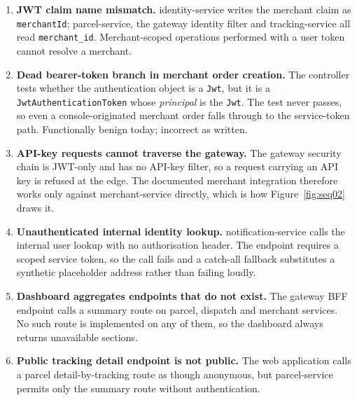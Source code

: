 \documentclass[11pt,a4paper,oneside,openany]{report}
\newcommand{\code}[1]{\texttt{\small #1}}
\begin{document}
\begin{enumerate}[leftmargin=*]
\item \textbf{JWT claim name mismatch.} identity-service writes the merchant claim as
\code{merchantId}; parcel-service, the gateway identity filter and tracking-service all read
\code{merchant\_id}. Merchant-scoped operations performed with a user token cannot resolve a
merchant.

\item \textbf{Dead bearer-token branch in merchant order creation.} The controller tests whether
the authentication object is a \code{Jwt}, but it is a \code{JwtAuthenticationToken} whose
\emph{principal} is the \code{Jwt}. The test never passes, so even a console-originated merchant
order falls through to the service-token path. Functionally benign today; incorrect as written.

\item \textbf{API-key requests cannot traverse the gateway.} The gateway security chain is
JWT-only and has no API-key filter, so a request carrying an API key is refused at the edge. The
documented merchant integration therefore works only against merchant-service directly, which is
how Figure~\ref{fig:seq02} draws it.

\item \textbf{Unauthenticated internal identity lookup.} notification-service calls the internal
user lookup with no authorisation header. The endpoint requires a scoped service token, so the
call fails and a catch-all fallback substitutes a synthetic placeholder address rather than
failing loudly.

\item \textbf{Dashboard aggregates endpoints that do not exist.} The gateway BFF endpoint calls a
summary route on parcel, dispatch and merchant services. No such route is implemented on any of
them, so the dashboard always returns unavailable sections.

\item \textbf{Public tracking detail endpoint is not public.} The web application calls a parcel
detail-by-tracking route as though anonymous, but parcel-service permits only the summary route
without authentication.
\end{enumerate}
\end{document}
